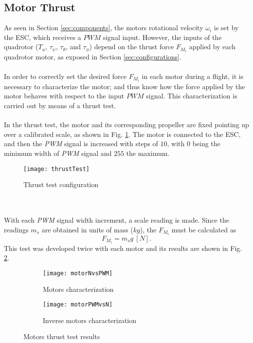\subsection{Motor Thrust}
As seen in Section \ref{sec:components}, the motors rotational velocity $\omega_{i}$ is set by the ESC, which receives a $PWM$ signal input. However, the inputs of the quadrotor ($T_u$, $\tau_\psi$, $\tau_\theta$, and $\tau_\phi$) depend on the thrust force $F_{M_{i}}$ applied by each quadrotor motor, as exposed in Section \ref{sec:configurations}.
\\\\
In order to correctly set the desired force $F_{M_{i}}$ in each motor during a flight, it is necessary to characterize the motor; and thus know how the force applied by the motor behaves with respect to the input $PWM$ signal. This characterization is carried out by means of a thrust test.
\\\\
In the thrust test, the motor and its corresponding propeller are fixed pointing up over a calibrated scale, as shown in Fig. \ref{fig:thrusttest}. The motor is connected to the ESC, and then the \textit{PWM} signal is increased with steps of $10$, with $0$ being the minimum width of \textit{PWM} signal and $255$ the maximum. 
\begin{figure}[h]
	\begin{center}
		\texttt{[image: thrustTest]}    
		\caption{Thrust test configuration} 
		\label{fig:thrusttest}
	\end{center}
\end{figure}
\\\\With each  \textit{PWM} signal width increment, a scale reading is made. Since the readings $m_{s}$ are obtained in units of mass ($kg$), the $F_{M_i}$ must be calculated as
\begin{equation}
F_{M_i} = m_{s}g\ [N].
\end{equation}
This test was developed twice with each motor and its results are shown in Fig. \ref{fig:motor}.
\begin{figure}[H]
\begin{subfigure}{.5\linewidth}
\centering
\texttt{[image: motorNvsPWM]}
\caption{Motors characterization}
\label{fig:motor}
\end{subfigure}%
\begin{subfigure}{.5\linewidth}
\centering
\texttt{[image: motorPWMvsN]}
\caption{Inverse motors characterization}
\label{fig:inversemotor}
\end{subfigure}
\caption{Motors thrust test results}
\label{fig:test}
\end{figure}
